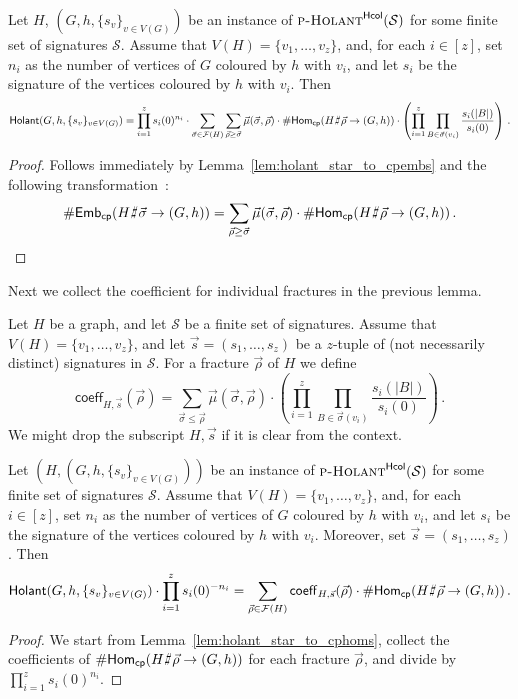 \documentclass[authorcolumns,numberwithinsect]{no-lipics-v2022}
\def\fracture#1#2{\ensuremath{#1\raisebox{.2ex}{\rotatebox[origin=c]{-15}{$\sharp$}}#2}}
\newcommand{\holantprobstar}{\text{\sc{p-Holant}}^{\mathsf{Hcol}}}
\newcommand{\homscp}{\mathsf{Hom}_{\mathsf{cp}}}
\newcommand{\embscp}{\mathsf{Emb}_{\mathsf{cp}}}
\newcommand{\holant}{\mathsf{Holant}}
\def\fracture#1#2{\ensuremath{#1\raisebox{.2ex}{\rotatebox[origin=c]{-15}{$\sharp$}}#2}}
\begin{document}
\begin{lemma}\label{lem:holant_star_to_cphoms}
    Let $H$, $(G,h,\{s_v\}_{v\in V(G)})$ be an instance of $\holantprobstar(\mathcal{S})$ for some finite set of signatures $\mathcal{S}$. Assume that $V(H)=\{v_1,\dots,v_z\}$, and, for each $i\in [z]$, set $n_i$ as the number of vertices of $G$ coloured by $h$ with $v_i$, and let $s_i$ be the signature of the vertices coloured by $h$ with $v_i$. 
    Then
    \[ \holant(G,h,\{s_v\}_{v\in V(G)}) = \prod_{i=1}^z s_i(0)^{n_i} \cdot \sum_{\vec{\sigma}\in \mathcal{F}(H)} \sum_{\vec{\rho} \geq \vec{\sigma}} \vec{\mu}(\vec{\sigma},\vec{\rho}) \cdot \#\homscp(\fracture{H}{\vec{\rho}} \to (G,h)) \cdot \left(\prod_{i=1}^z \prod_{B \in \vec{\sigma}(v_i)} \frac{s_i(|B|)}{s_i(0)}  \right) \,.\]
\end{lemma}
\begin{proof}
    Follows immediately by Lemma~\ref{lem:holant_star_to_cpembs} and the following transformation~\cite[Equation (4.1)]{PeyerimhoffRSSVW23}:
    \[\#\embscp(\fracture{H}{\vec{\sigma}} \to (G,h)) = \sum_{\vec{\rho} \geq \vec{\sigma}} \vec{\mu}(\vec{\sigma},\vec{\rho}) \cdot \#\homscp(\fracture{H}{\vec{\rho}} \to (G,h))\,. \]
\end{proof}

Next we collect the coefficient for individual fractures in the previous lemma. 

\begin{definition}
   Let $H$ be a graph, and let $\mathcal{S}$ be a finite set of signatures. Assume that $V(H)=\{v_1,\dots,v_z\}$, and let $\vec{s}=(s_1,\dots,s_z)$ be a $z$-tuple of (not necessarily distinct) signatures in $\mathcal{S}$. For a fracture $\vec{\rho}$ of $H$ we define
   \[ \mathsf{coeff}_{H,\vec{s}}(\vec{\rho})= \sum_{\vec{\sigma} \leq \vec{\rho}} \vec{\mu}(\vec{\sigma},\vec{\rho}) \cdot \left(\prod_{i=1}^z \prod_{B \in \vec{\sigma}(v_i)} \frac{s_i(|B|)}{s_i(0)}  \right) \,.\]
   We might drop the subscript $H,\vec{s}$ if it is clear from the context.
\end{definition}

\begin{corollary}\label{cor:collect_coeffs}
    Let $(H,(G,h,\{s_v\}_{v\in V(G)}))$ be an instance of $\holantprobstar(\mathcal{S})$ for some finite set of signatures $\mathcal{S}$. Assume that $V(H)=\{v_1,\dots,v_z\}$, and, for each $i\in [z]$, set $n_i$ as the number of vertices of $G$ coloured by $h$ with $v_i$, and let $s_i$ be the signature of the vertices coloured by $h$ with $v_i$. Moreover, set $\vec{s}=(s_1,\dots,s_z)$.
    Then
    \[ \holant(G,h,\{s_v\}_{v\in V(G)}) \cdot \prod_{i=1}^z s_i(0)^{-n_i} = \sum_{\vec{\rho}\in \mathcal{F}(H)} \mathsf{coeff}_{H,\vec{s}}(\vec{\rho})  \cdot \#\homscp(\fracture{H}{\vec{\rho}} \to (G,h))  \,.\]
\end{corollary}
\begin{proof}
    We start from Lemma~\ref{lem:holant_star_to_cphoms}, collect the coefficients of $\#\homscp(\fracture{H}{\vec{\rho}} \to (G,h))$ for each fracture $\vec{\rho}$, and divide by $\prod_{i=1}^z s_i(0)^{n_i}$.
\end{proof}
\end{document}
